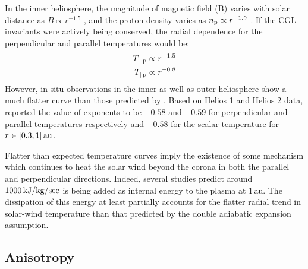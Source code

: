             In the inner heliosphere, the magnitude of magnetic field (B) varies with solar distance
            as $B \propto r^{-1.5}$ \citep{Hellinger2013,Hanneson2020}, and the proton density
            varies as $n_{\rm p} \propto r^{-1.9}$ \citep{Hellinger2013}. If the CGL invariants were
            actively being conserved, the radial dependence for the perpendicular and parallel
            temperatures would be:
            \begin{align}
                    T_{\rm \perp p} & \propto r^{-1.5} \label{eq:tperp_trend}\\
                    T_{\rm \parallel p} & \propto r^{-0.8} \label{eq:tpar_trend}
            \end{align}
            However, in-situ observations in the inner as well as outer heliosphere show a much
            flatter curve than those predicted by . Based on
            Helios 1 and Helios 2 data, \citet{Hellinger2013} reported the value of exponents to be
            $-0.58$ and $-0.59$ for perpendicular and parallel temperatures respectively and $-0.58$
            for the scalar temperature for $r \in [0.3, 1]\,\rm{au}$.

            Flatter than expected temperature curves imply the existence of some mechanism which
            continues to heat the solar wind beyond the corona in both the parallel and
            perpendicular directions. Indeed, several studies
            \citep{ColemanJr1968,Verma1995,SorrisoValvo2007,MacBride2008} predict around
            $1000\,\rm{kJ/kg/sec}$ is being added as internal energy to the plasma at 1\,au.
            The dissipation of this energy at least partially accounts for the flatter radial trend
            in solar-wind temperature than that predicted by the double adiabatic expansion
            assumption.

        \subsection{Anisotropy} \label{sec:aniso}
        

